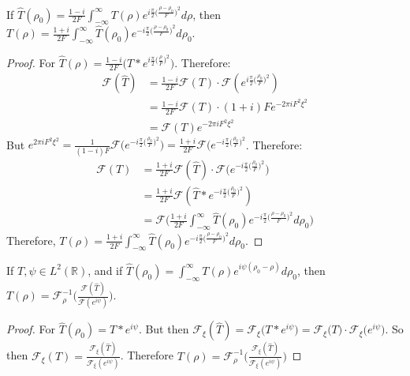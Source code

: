\documentclass[crop=false,class=book,oneside]{standalone}
\begin{document}
            \begin{theorem}
            If $\hat{T}(\rho_0) = \frac{1-i}{2F}\int_{-\infty}^{\infty}T(\rho) e^{i\frac{\pi}{2}\big(\frac{\rho-\rho_0}{F}\big)^2}d\rho$, then $T(\rho) = \frac{1+i}{2F}\int_{-\infty}^{\infty}\hat{T}(\rho_0)e^{-i\frac{\pi}{2}\big(\frac{\rho-\rho_0}{F}\big)^2}d\rho_0$.
            \end{theorem}
            \begin{proof}
            For $\hat{T}(\rho) = \frac{1-i}{2F}(T* e^{i \frac{\pi}{2}\big(\frac{\rho}{F}\big)^2}\big)$. Therefore:
            \begin{align*}
            \mathcal{F}(\hat{T})&=\frac{1-i}{2F}\mathcal{F}(T)\cdot \mathcal{F}(e^{i\frac{\pi}{2}\big(\frac{\rho_0}{F}\big)^2})\\
            &=\frac{1-i}{2F}\mathcal{F}(T)\cdot(1+i)Fe^{-2\pi i F^2 \xi^2}\\
            &=\mathcal{F}(T)e^{-2\pi i F^2 \xi^2}
            \end{align*}
            But $e^{2\pi iF^{2}\xi^{2}}=\frac{1}{(1-i)F}\mathcal{F}\big(e^{-i\frac{\pi}{2}\big(\frac{\rho_0}{F}\big)^2}\big) = \frac{1+i}{2F} \mathcal{F}\big(e^{-i\frac{\pi}{2}\big(\frac{\rho_0}{F}\big)^2}$. Therefore:
            \begin{align*}
            \mathcal{F}(T)&=\frac{1+i}{2F}\mathcal{F}(\hat{T})\cdot\mathcal{F}\big(e^{-i\frac{\pi}{2}\big(\frac{\rho_0}{F}\big)^2}\big)\\
            &=\frac{1+i}{2F}\mathcal{F}(\hat{T}*e^{-i\frac{\pi}{2}\big(\frac{\rho_0}{F}\big)^2})\\
            &=\mathcal{F}\bigg(\frac{1+i}{2F}\int_{-\infty}^{\infty} \hat{T}(\rho_0)e^{-i\frac{\pi}{2}\big(\frac{\rho - \rho_0}{F}\big)^2} d\rho_0\bigg)
            \end{align*}
            Therefore, $T(\rho) = \frac{1+i}{2F}\int_{-\infty}^{\infty}\hat{T}(\rho_0)e^{-i\frac{\pi}{2}\big(\frac{\rho - \rho_0}{F}\big)^2}d\rho_0$.
            \end{proof}
            
            \begin{theorem}
            If $T,\psi \in L^2(\mathbb{R})$, and if $\hat{T}(\rho_0) = \int_{-\infty}^{\infty} T(\rho)e^{i\psi(\rho_0-\rho)}d\rho_0$, then $T(\rho) = \mathcal{F}^{-1}_{\rho}\big(\frac{\mathcal{F}(\hat{T})}{\mathcal{F}(e^{i\psi})}\big)$.
            \end{theorem}
            \begin{proof}
            For $\hat{T}(\rho_0) = T* e^{i\psi}$. But then $\mathcal{F}_{\xi}(\hat{T}) = \mathcal{F}_{\xi}\big(T* e^{i\psi}\big) = \mathcal{F}_{\xi}\big(T\big)\cdot \mathcal{F}_{\xi}\big(e^{i\psi}\big)$. So then $\mathcal{F}_{\xi}(T) = \frac{\mathcal{F}_{\xi}(\hat{T})}{\mathcal{F}_{\xi}(e^{i\psi})}$. Therefore $T(\rho) = \mathcal{F}^{-1}_{\rho}\big(\frac{\mathcal{F}_{\xi}(\hat{T})}{\mathcal{F}_{\xi}(e^{i\psi})}\big)$
            \end{proof}
\end{document}
